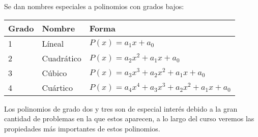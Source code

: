 Se dan nombres especiales a polinomios con grados bajos:
\begin{table}[H]
    \centering
    \begin{tabular}{p{1.5cm} p{2.5cm} p{6.5cm}}
        \hline
        Grado & Nombre & Forma \\
        \hline \hline
        1 & Líneal & $P(x) = a_1 x + a_0$\\
        2 & Cuadrático & $P(x) = a_2 x^2 + a_1 x + a_0$\\
        3 & Cúbico & $P(x) = a_3 x^3 + a_2 x^2 + a_1 x + a_0$\\
        4 & Cuártico & $P(x) = a_4 x^4 + a_3 x^3 + a_2 x^2 + a_1 x + a_0$\\
        \hline
    \end{tabular}
\end{table}
Los polinomios de grado dos y tres son de especial interés debido a la gran cantidad de problemas en la que estos aparecen, a lo largo del curso veremos las propiedades más importantes de estos polinomios.

